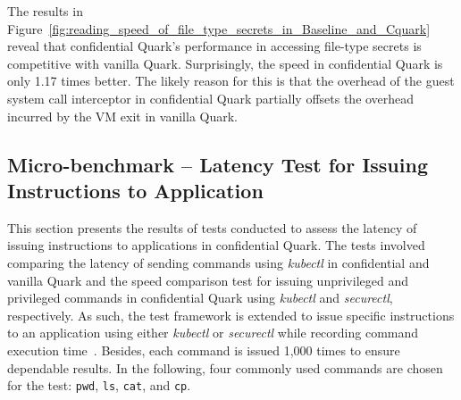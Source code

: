 The results in Figure~\ref{fig:reading_speed_of_file_type_secrets_in_Baseline_and_Cquark} reveal that confidential Quark's performance in accessing file-type secrets is competitive with vanilla Quark. Surprisingly, the speed in 
confidential Quark is only 1.17 times better. The likely reason for this is that the overhead of the guest system call interceptor in confidential Quark partially offsets the overhead incurred by the VM exit in vanilla Quark.

\subsection{Micro-benchmark – Latency Test for Issuing Instructions to Application}
\label{bench_issuing_Instructions}

This section presents the results of tests conducted to assess the latency of issuing instructions to applications in confidential Quark. The tests involved comparing the latency of sending commands using \emph{kubectl} in confidential and vanilla Quark and the speed comparison test for issuing 
unprivileged and privileged commands in confidential Quark using \emph{kubectl} and \emph{securectl}, respectively. As such, the test framework is extended to issue specific instructions to an application using either \emph{kubectl} or \emph{securectl} while recording command 
execution time~\cite*{benchamark_perf_kubectl}. Besides, each command is issued 1,000 times to ensure dependable results. In the following, four commonly used commands are chosen for the test: \texttt{pwd}, \texttt{ls}, \texttt{cat}, and \texttt{cp}.



